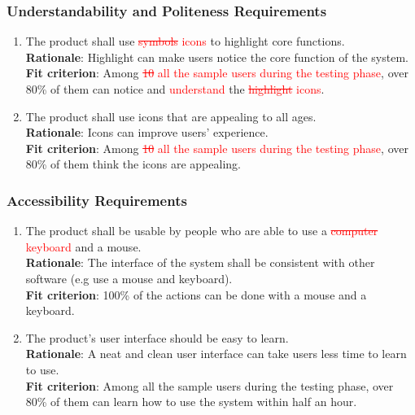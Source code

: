\documentclass{article}
\begin{document}
\subsubsection{Understandability and Politeness Requirements}
\begin{enumerate}[UH4.1]
    \item The product shall use \textcolor{red}{\st{symbols} icons} to highlight core functions.\\
    \textbf{Rationale}: Highlight can make users notice the core function of the system.\\
    \textbf{Fit criterion}: Among \textcolor{red}{\st{10} all the sample users during the 
    testing phase}, over 80\% of them can notice and 
    \textcolor{red}{understand} the \textcolor{red}{\st{highlight} icons}.
    
    \item The product shall use icons that are appealing to all ages.\\
    \textbf{Rationale}: Icons can improve users' experience.\\
    \textbf{Fit criterion}: Among \textcolor{red}{\st{10} all the sample users during the 
    testing phase}, over 80\% of them think the icons are appealing.
\end{enumerate}
\subsubsection{Accessibility Requirements}
\begin{enumerate}[UH5.1]
    \item The product shall be usable by people who are able to use a \textcolor{red}{\st{computer}
     keyboard} and a mouse.\\
    \textbf{Rationale}: The interface of the system shall be consistent with other software (e.g use a
     mouse and keyboard).\\
    \textbf{Fit criterion}: 100\% of the actions can be done with a mouse and a keyboard.
    
    \item The product's user interface should be easy to learn.\\
    \textbf{Rationale}: A neat and clean user interface can take users less time to learn to use.\\
    \textbf{Fit criterion}: Among all the sample users during the testing phase, over 80\% of them
     can learn how to use the system within half an hour.
\end{enumerate}
\end{document}
